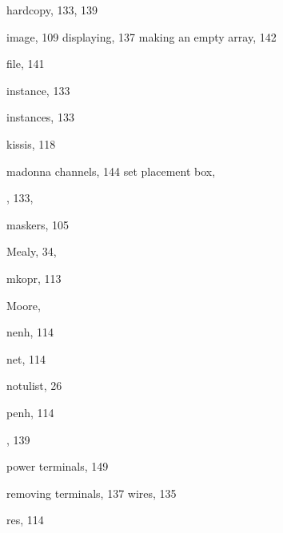 \begin{theindex}
  \indexspace

  \item hardcopy, 133, 139

  \indexspace

  \item image, 109
    \subitem displaying, 137
    \subitem making an empty array, 142
  \item {} file, 141
  \item instance, 133
  \item instances, 133

  \indexspace

  \item kissis, 118

  \indexspace

  \item madonna
    \subitem channels, 144
    \subitem set placement box, 
  \item {}, 133, 
  \item maskers, 105
  \item Mealy, 34, 
  \item mkopr, 113
  \item Moore, 

  \indexspace

  \item nenh, 114
  \item net, 114
  \item notulist, 26

  \indexspace

  \item penh, 114
  \item {}, 139
  \item power terminals, 149

  \indexspace

  \item removing
    \subitem terminals, 137
    \subitem wires, 135
  \item res, 114

  \indexspace


\end{theindex}
